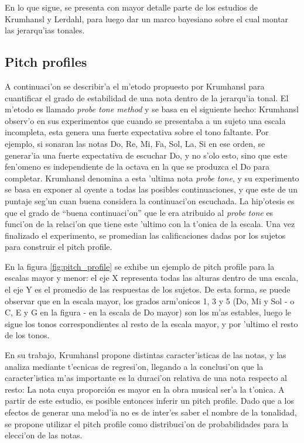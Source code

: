En lo que sigue, se presenta con mayor detalle parte de los estudios de Krumhansl y Lerdahl, para luego dar un marco bayesiano sobre el cual montar las jerarqu'ias tonales.

\subsection{Pitch profiles}
\label{sec:pitch_profile}
A continuaci'on se describir'a el m'etodo propuesto por Krumhansl para cuantificar el grado de estabilidad de una nota dentro de la jerarqu'ia tonal. 
El m'etodo es llamado \emph{probe tone method} y se basa en el siguiente hecho: Krumhansl observ'o en sus experimentos que cuando se presentaba a un sujeto una escala 
incompleta, esta genera una fuerte expectativa sobre el tono faltante. Por ejemplo, si sonaran las notas Do, Re, Mi, Fa, Sol, La, Si en ese orden, se generar'ia una fuerte 
expectativa de escuchar Do, y no s'olo esto, sino que este fen'omeno es independiente de la octava en la que se produzca el Do para completar.
Krumhansl denomina a esta 'ultima nota \emph{probe tone}, y su experimento se basa en exponer al oyente a todas las posibles continuaciones, y que este de un puntaje
seg'un cuan buena considera la continuaci'on escuchada. La hip'otesis es que el grado de ``buena continuaci'on'' que le era atribuido al \emph{probe tone} es funci'on
de la relaci'on que tiene este 'ultimo con la t'onica de la escala.
Una vez finalizado el experimento, se promedian las calificaciones dadas por los sujetos para construir el pitch profile.

 En la figura \ref{fig:pitch_profile} se exhibe un ejemplo de pitch profile para la escalas mayor y menor: 
el eje X representa todas las alturas dentro de una escala, el eje Y es el promedio de las respuestas de los sujetos. De esta forma, se puede observar que en la escala mayor, los grados arm'onicos
1, 3 y 5 (Do, Mi y Sol - o C, E y G en la figura - en la escala de Do mayor) son los m'as estables, luego le sigue los tonos correspondientes al resto de la escala mayor, y por 'ultimo el resto de los 
tonos.


\begin{imagen}
    \width{10cm}
\end{imagen}


En su trabajo, Krumhansl propone distintas caracter'isticas de las notas, y las analiza mediante t'ecnicas de regresi'on, llegando a la conclusi'on que la
caracter'istica m'as importante es la duraci'on relativa de una nota respecto al resto: La nota cuya proporci\'on es mayor en la obra musical ser'a la t'onica. 
A partir de este estudio, es posible entonces inferir un pitch profile. Dado que a los efectos de generar una melod'ia no es de inter'es saber el nombre de la 
tonalidad, se propone utilizar el pitch profile como distribuci'on de probabilidades para la elecci'on de las notas.

